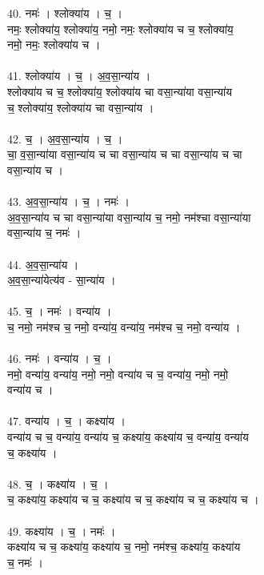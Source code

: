 40. नमः॑ । श्लोक्या॑य । च॒ ।\\
नमः॒ श्लोक्या॑य॒ श्लोक्या॑य॒ नमो॒ नमः॒ श्लोक्या॑य च च॒ श्लोक्या॑य॒\\
नमो॒ नमः॒ श्लोक्या॑य च ।\\
\\
41. श्लोक्या॑य । च॒ । अ॒व॒सा॒न्या॑य ।\\
श्लोक्या॑य च च॒ श्लोक्या॑य॒ श्लोक्या॑य चा वसा॒न्या॑या वसा॒न्या॑य\\
च॒ श्लोक्या॑य॒ श्लोक्या॑य चा वसा॒न्या॑य ।\\
\\
42. च॒ । अ॒व॒सा॒न्या॑य । च॒ ।\\
चा॒ व॒सा॒न्या॑या वसा॒न्या॑य च चा वसा॒न्या॑य च चा वसा॒न्या॑य च चा\\
वसा॒न्या॑य च ।\\
\\
43. अ॒व॒सा॒न्या॑य । च॒ । नमः॑ ।\\
अ॒व॒सा॒न्या॑य च चा वसा॒न्या॑या वसा॒न्या॑य च॒ नमो॒ नम॑श्चा वसा॒न्या॑या\\
वसा॒न्या॑य च॒ नमः॑ ।\\
\\
44. अ॒व॒सा॒न्या॑य ।\\
अ॒व॒सा॒न्या॑येत्य॑व - सा॒न्या॑य ।\\
\\
45. च॒ । नमः॑ । वन्या॑य ।\\
च॒ नमो॒ नम॑श्च च॒ नमो॒ वन्या॑य॒ वन्या॑य॒ नम॑श्च च॒ नमो॒ वन्या॑य ।\\
\\
46. नमः॑ । वन्या॑य । च॒ ।\\
नमो॒ वन्या॑य॒ वन्या॑य॒ नमो॒ नमो॒ वन्या॑य च च॒ वन्या॑य॒ नमो॒ नमो॒\\
वन्या॑य च ।\\
\\
47. वन्या॑य । च॒ । कक्ष्या॑य ।\\
वन्या॑य च च॒ वन्या॑य॒ वन्या॑य च॒ कक्ष्या॑य॒ कक्ष्या॑य च॒ वन्या॑य॒ वन्या॑य\\
च॒ कक्ष्या॑य ।\\
\\
48. च॒ । कक्ष्या॑य । च॒ ।\\
च॒ कक्ष्या॑य॒ कक्ष्या॑य च च॒ कक्ष्या॑य च च॒ कक्ष्या॑य च च॒ कक्ष्या॑य च ।\\
\\
49. कक्ष्या॑य । च॒ । नमः॑ ।\\
कक्ष्या॑य च च॒ कक्ष्या॑य॒ कक्ष्या॑य च॒ नमो॒ नम॑श्च॒ कक्ष्या॑य॒ कक्ष्या॑य\\
च॒ नमः॑ ।\\
\\
